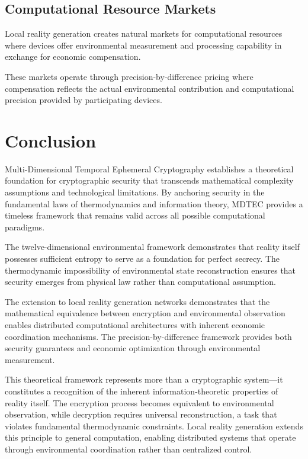 \documentclass[12pt]{article}
\begin{document}
\subsection{Computational Resource Markets}

Local reality generation creates natural markets for computational resources where devices offer environmental measurement and processing capability in exchange for economic compensation.

These markets operate through precision-by-difference pricing where compensation reflects the actual environmental contribution and computational precision provided by participating devices.

\section{Conclusion}

Multi-Dimensional Temporal Ephemeral Cryptography establishes a theoretical foundation for cryptographic security that transcends mathematical complexity assumptions and technological limitations. By anchoring security in the fundamental laws of thermodynamics and information theory, MDTEC provides a timeless framework that remains valid across all possible computational paradigms.

The twelve-dimensional environmental framework demonstrates that reality itself possesses sufficient entropy to serve as a foundation for perfect secrecy. The thermodynamic impossibility of environmental state reconstruction ensures that security emerges from physical law rather than computational assumption.

The extension to local reality generation networks demonstrates that the mathematical equivalence between encryption and environmental observation enables distributed computational architectures with inherent economic coordination mechanisms. The precision-by-difference framework provides both security guarantees and economic optimization through environmental measurement.

This theoretical framework represents more than a cryptographic system—it constitutes a recognition of the inherent information-theoretic properties of reality itself. The encryption process becomes equivalent to environmental observation, while decryption requires universal reconstruction, a task that violates fundamental thermodynamic constraints. Local reality generation extends this principle to general computation, enabling distributed systems that operate through environmental coordination rather than centralized control.
\end{document}
